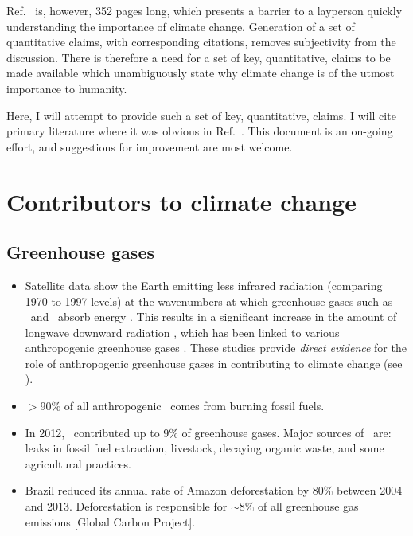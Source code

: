 \documentclass[11pt]{article}
\begin{document}
Ref.~\cite{Romm18} is, however, 352 pages long, which presents a barrier to a layperson quickly understanding the importance of climate change. Generation of a set of quantitative claims, with corresponding citations, removes subjectivity from the discussion. There is therefore a need for a set of key, quantitative, claims to be made available which unambiguously state why climate change is of the utmost importance to humanity. 

Here, I will attempt to provide such a set of key, quantitative, claims. I will cite primary literature where it was obvious in Ref.~\cite{Romm18}. This document is an on-going effort, and suggestions for improvement are most welcome.  

\section{Contributors to climate change}

\subsection{Greenhouse gases}
\begin{itemize}
\item Satellite data show the Earth emitting less infrared radiation (comparing 1970 to 1997 levels) at the wavenumbers at which greenhouse gases such as \cotwo\ and \meth\ absorb energy \cite{Harries01}. This results in a significant increase in the amount of longwave downward radiation \cite{Philipona04}, which has been linked to various anthropogenic greenhouse gases \cite{Evans06}. These studies provide \textit{direct evidence} for the role of anthropogenic greenhouse gases in contributing to climate change (see \cite{SkepSci73}).
\item $>$90\% of all anthropogenic \cotwo\ comes from burning fossil fuels.
\item In 2012, \meth\ contributed up to 9\% of greenhouse gases. Major sources of \meth\ are: leaks in fossil fuel extraction, livestock, decaying organic waste, and some agricultural practices.
\item Brazil reduced its annual rate of Amazon deforestation by 80\% between 2004 and 2013. Deforestation is responsible for $\sim 8\%$ of all greenhouse gas emissions [Global Carbon Project].
\end{itemize}
\end{document}

